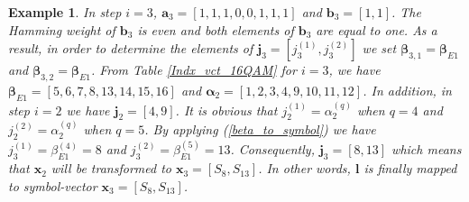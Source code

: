 \documentclass[12pt, draftclsnofoot, onecolumn]{IEEEtran}
\newcommand{\mb}[1]{\boldsymbol{#1}}
\newtheorem{example}{Example}
\begin{document}
\begin{example}








In  step $i = 3$, $\mb{a}_{3}=[1,1,1,0,0,1,1,1]$  and  $\mb{b}_{3} = [1,1]$. The Hamming weight of $\mb{b}_{3}$ is even and both elements of $\mb{b}_{3}$ are equal to one. As a result, in order to determine the elements of $\mb{j}_{3} = [j_{3}^{(1)}, j_{3}^{(2)}]$ we set    $\mb{\beta}_{3,1}= \mb{\beta}_{E1}$ and $\mb{\beta}_{3,2}= \mb{\beta}_{E1}$.  From Table \ref{Indx_vct_16QAM} for $i = 3$,  we have $\mb{\beta}_{E1} = [5, 6, 7, 8, 13, 14, 15, 16]$ and $\mb{\alpha}_{2} = [1, 2, 3, 4, 9, 10, 11, 12]$. In addition, in step $i=2$ we have $\mb{j}_{2} = [4,9]$. It is obvious that  $j_{2}^{(1)} = \alpha_{2}^{(q)}$  when $q = 4$   and $j_{2}^{(2)} = \alpha_{2}^{(q)}$ when $q = 5$. By applying (\ref{beta_to_symbol}) we have %
$j_{3}^{(1)} = \beta_{E1}^{(4)} = 8$ and $j_{3}^{(2)}=\beta_{E1}^{(5)} = 13$. Consequently, $\mb{j}_{3} = [8,13]$ which means that $\mb{x}_{2}$  will  be transformed to $\mb{x}_{3} = [S_{8}, S_{13}]$. In other words, $\mb{l}$ is finally  mapped to symbol-vector $\mb{x}_{3}=[S_{8},S_{13}]$.
\end{example} 
 
 
 
\end{document}
